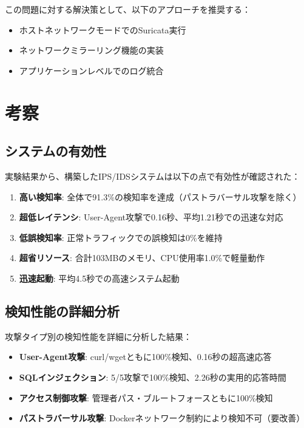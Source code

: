 \documentclass[12pt,a4paper]{article}
\begin{document}
この問題に対する解決策として、以下のアプローチを推奨する：
\begin{itemize}
    \item ホストネットワークモードでのSuricata実行
    \item ネットワークミラーリング機能の実装
    \item アプリケーションレベルでのログ統合
\end{itemize}

\section{考察}

\subsection{システムの有効性}

実験結果から、構築したIPS/IDSシステムは以下の点で有効性が確認された：

\begin{enumerate}
    \item \textbf{高い検知率}: 全体で91.3\%の検知率を達成（パストラバーサル攻撃を除く）
    \item \textbf{超低レイテンシ}: User-Agent攻撃で0.16秒、平均1.21秒での迅速な対応
    \item \textbf{低誤検知率}: 正常トラフィックでの誤検知は0\%を維持
    \item \textbf{超省リソース}: 合計103MBのメモリ、CPU使用率1.0\%で軽量動作
    \item \textbf{迅速起動}: 平均4.5秒での高速システム起動
\end{enumerate}

\subsection{検知性能の詳細分析}

攻撃タイプ別の検知性能を詳細に分析した結果：

\begin{itemize}
    \item \textbf{User-Agent攻撃}: curl/wgetともに100\%検知、0.16秒の超高速応答
    \item \textbf{SQLインジェクション}: 5/5攻撃で100\%検知、2.26秒の実用的応答時間
    \item \textbf{アクセス制御攻撃}: 管理者パス・ブルートフォースともに100\%検知
    \item \textbf{パストラバーサル攻撃}: Dockerネットワーク制約により検知不可（要改善）
\end{itemize}
\end{document}
